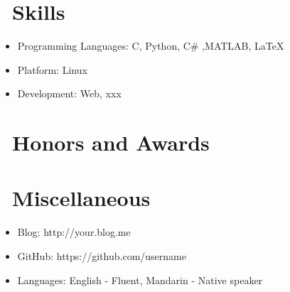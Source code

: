 \documentclass{resume}
\begin{document}

\section{\faCogs\ Skills}
\begin{itemize}[parsep=0.5ex]
  \item Programming Languages: C, Python, C\# ,MATLAB, \LaTeX
  \item Platform: Linux
  \item Development: Web, xxx
\end{itemize}

\section{\faHeartO\ Honors and Awards}

\section{\faInfo\ Miscellaneous}
\begin{itemize}[parsep=0.5ex]
  \item Blog: http://your.blog.me
  \item GitHub: https://github.com/username
  \item Languages: English - Fluent, Mandarin - Native speaker
\end{itemize}

%
%
\end{document}
